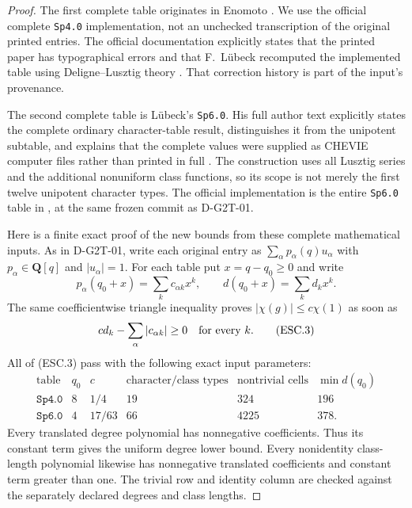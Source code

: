 \begin{proof}
The first complete table originates in Enomoto
\cite[\S4, pp.~80--85, and Tables~IV-1/IV-2,
pp.~92--94]{ESC:Enomoto}.  We use the official complete
\texttt{Sp4.0} implementation, not an unchecked transcription
of the original printed entries.  The official documentation
explicitly states that the printed paper has typographical
errors and that F.~L\"ubeck recomputed the implemented table
using Deligne--Lusztig theory \cite{G2T:GCT}.
That correction history is part of the input's provenance.

The second complete table is L\"ubeck's \texttt{Sp6.0}.
His full author text explicitly states the complete ordinary
character-table result, distinguishes it from the unipotent
subtable, and explains that the complete values were supplied
as CHEVIE computer files rather than printed in full
\cite[Introduction, pp.~3--4; \S2.2, pp.~18--21;
\S9, pp.~78--79]{ESC:Luebeck}.
The construction uses all Lusztig series and the additional
nonuniform class functions, so its scope is not merely the
first twelve unipotent character types.  The official
implementation is the entire \texttt{Sp6.0} table in
\cite{G2T:GCT}, at the same frozen commit as D-G2T-01.

Here is a finite exact proof of the new bounds from these
complete mathematical inputs.  As in D-G2T-01, write each
original entry as $\sum_\alpha p_\alpha(q)u_\alpha$ with
$p_\alpha\in\mathbf Q[q]$ and $|u_\alpha|=1$.
For each table put $x=q-q_0\ge0$ and write
\[
 p_\alpha(q_0+x)=\sum_k c_{\alpha k}x^k,
 \qquad d(q_0+x)=\sum_k d_kx^k.
\]
The same coefficientwise triangle inequality proves
$|\chi(g)|\le c\chi(1)$ as soon as
\[
                 c d_k-\sum_\alpha|c_{\alpha k}|\ge0
                      \quad\hbox{for every }k.             \tag{ESC.3}
\]
All of (ESC.3) pass with the following exact input parameters:
\[
\begin{array}{c|r|c|r|r|r}
\text{table}&q_0&c&\text{character/class types}&
\text{nontrivial cells}&\min d(q_0)\\\hline
\texttt{Sp4.0}&8&1/4&19&324&196\\
\texttt{Sp6.0}&4&17/63&66&4225&378.
\end{array}                                                   \tag{ESC.4}
\]
Every translated degree polynomial has nonnegative coefficients.
Thus its constant term gives the uniform degree lower bound.
Every nonidentity class-length polynomial likewise has
nonnegative translated coefficients and constant term greater
than one.  The trivial row and identity column are checked
against the separately declared degrees and class lengths.


\end{proof}
